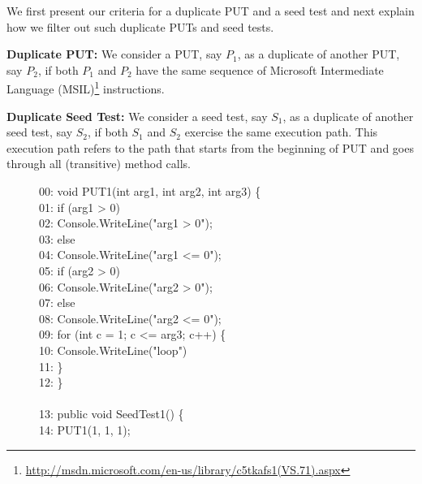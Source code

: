 We first present our criteria for a duplicate PUT and a seed test and next explain
how we filter out such duplicate PUTs and seed tests.

\textbf{Duplicate PUT:} We consider a PUT, say $P_1$, as a duplicate
of another PUT, say $P_2$, if both $P_1$ and $P_2$ have the same sequence of
Microsoft Intermediate Language (MSIL)\footnote{\url{http://msdn.microsoft.com/en-us/library/c5tkafs1(VS.71).aspx}} 
instructions.

\textbf{Duplicate Seed Test:} We consider a seed test, say $S_1$, as a duplicate of 
another seed test, say $S_2$, if both $S_1$ and $S_2$ exercise the same execution path.
This execution path refers to the path that starts from the beginning of PUT and goes through all (transitive) method calls.

\begin{figure}[t]
\begin{CodeOut}
00: void PUT1(int arg1, int arg2, int arg3) \{\\
01: \hspace*{0.2in}if (arg1 > 0)\\
02: \hspace*{0.4in}Console.WriteLine("arg1 > 0"); \\
03: \hspace*{0.2in}else\\
04: \hspace*{0.4in}Console.WriteLine("arg1 <= 0"); \\
05: \hspace*{0.2in}if (arg2 > 0)\\
06: \hspace*{0.4in}Console.WriteLine("arg2 > 0"); \\
07: \hspace*{0.2in}else\\
08: \hspace*{0.4in}Console.WriteLine("arg2 <= 0"); \\
09: \hspace*{0.2in}for (int c = 1; c <= arg3; c++)  \{ \\
10: \hspace*{0.4in}Console.WriteLine("loop") \\
11: \hspace*{0.2in}\}\\
12: \}\\
\\
13: public void SeedTest1() \{\\
14: \hspace*{0.2in}PUT1(1, 1, 1);\\

\end{CodeOut}
\end{figure}
